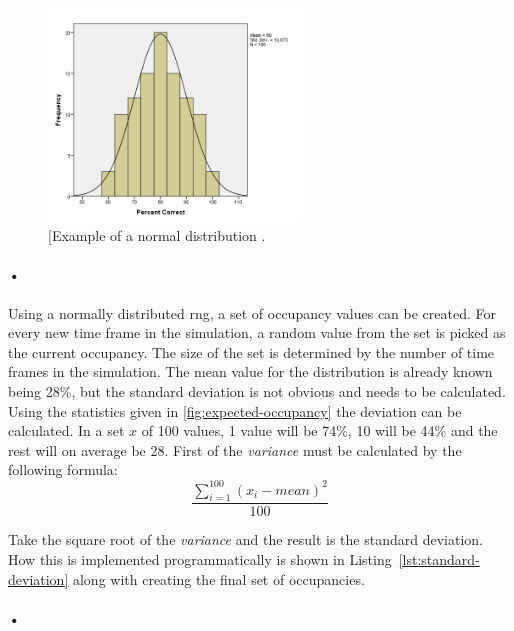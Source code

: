 \documentclass[a4paper, 12pt, openright, twoside]{report}
\begin{document}
\begin{figure}[h!]
	\centering
		\includegraphics[width=0.6\textwidth]{images/normal-dist.png}
		\caption[Example of a normal distribution.]{[Example of a normal distribution \cite{normal-dist-image}.}
		\label{fig:normal-dist}
\end{figure}

\paragraph{•}
Using a normally distributed \gls{rng}, a set of occupancy values can be created.
For every new time frame in the simulation, a random value from the set is picked as the current occupancy.
The size of the set is determined by the number of time frames in the simulation.
The mean value for the distribution is already known being 28\%, but the standard deviation is not obvious and needs to be calculated.
Using the statistics given in \ref{fig:expected-occupancy} the deviation can be calculated.
In a set $x$ of 100 values, 1 value will be 74\%, 10 will be 44\% and the rest will on average be 28.
First of the \textit{variance} must be calculated by the following formula:
\begin{equation}
\frac{\sum_{i=1}^{100} (x_i - mean)^2}{100}
\end{equation}
 
Take the square root of the \textit{variance} and the result is the standard deviation.
How this is implemented programmatically is shown in Listing~\ref{lst:standard-deviation} along with creating the final set of occupancies.

\paragraph{•}
\begin{minipage}{\linewidth}

\end{minipage}
\end{document}
